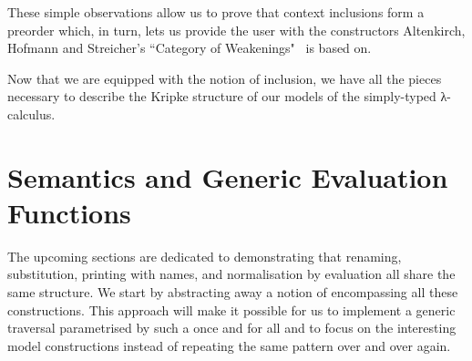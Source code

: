 \noindent\begin{minipage}[t]{0.4\textwidth}
\end{minipage}
\begin{minipage}[t]{0.60\textwidth}
\end{minipage}

These simple observations allow us to prove that context inclusions
form a preorder which, in turn, lets us provide the user with the
constructors Altenkirch, Hofmann and Streicher's ``Category of
Weakenings"~\cite{altenkirch1995categorical} is based on.

\noindent\begin{minipage}[t]{0.3\textwidth}
\end{minipage}
\begin{minipage}[t]{0.7\textwidth}
\end{minipage}

\noindent\begin{minipage}[t]{0.5\textwidth}
\end{minipage}
\begin{minipage}[t]{0.5\textwidth}
\end{minipage}

Now that we are equipped with the notion of inclusion, we have all
the pieces necessary to describe the Kripke structure of our models
of the simply-typed λ-calculus.

\section{Semantics and Generic Evaluation Functions}

The upcoming sections are dedicated to demonstrating that renaming,
substitution, printing with names, and normalisation by evaluation all
share the same structure. We start by abstracting away a notion of
 encompassing all these constructions. This approach
will make it possible for us to implement a generic traversal
parametrised by such a  once and for all and to focus
on the interesting model constructions instead of repeating the same
pattern over and over again.

